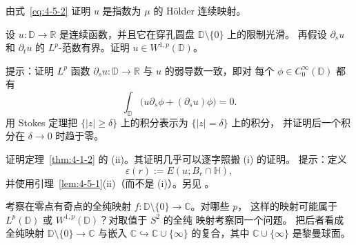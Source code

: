 \begin{exercise}\label{ex:4-5-3}
由式~\eqref{eq:4-5-2} 证明 $u$ 是指数为 $\mu$ 的 Hölder 连续映射。
\end{exercise}

\begin{exercise}\label{ex:4-5-4}
设 $u:\mathbb D\to\mathbb R$ 是连续函数，并且它在穿孔圆盘
$\mathbb D\setminus\{0\}$ 上的限制光滑。
再假设 $\partial_su$ 和 $\partial_tu$ 的 $L^p$-范数有界。证明
$u\in W^{1,p}(\mathbb D)$。

提示：证明 $L^p$ 函数 $\partial_su:\mathbb D\to\mathbb R$ 与 $u$ 的弱导数一致，即对
每个 $\phi\in C_0^\infty(\mathbb D)$ 都有
\[
  \int_{\mathbb D}\bigl(u\partial_s\phi+(\partial_su)\phi\bigr)=0.
\]
用 Stokes 定理把 $\{|z|\ge\delta\}$ 上的积分表示为 $\{|z|=\delta\}$ 上的积分，
并证明后一个积分在 $\delta\to0$ 时趋于零。
\end{exercise}

\begin{exercise}\label{ex:4-5-5}
证明定理~\ref{thm:4-1-2} 的 (ii)。其证明几乎可以逐字照搬 (i) 的证明。
提示：定义
\[
  \varepsilon(r):=E(u;B_r\cap\mathbb H),
\]
并使用引理~\ref{lem:4-5-1}(ii)（而不是 (i)）。另见 。
\end{exercise}

\begin{exercise}\label{ex:4-5-6}
考察在零点有奇点的全纯映射 $f:\mathbb D\setminus\{0\}\to\mathbb C$。对哪些 $p$，
这样的映射可能属于 $L^p(\mathbb D)$ 或 $W^{1,p}(\mathbb D)$？对取值于 $S^2$ 的全纯
映射考察同一个问题。
把后者看成全纯映射 $\mathbb D\setminus\{0\}\to\mathbb C$ 与嵌入
$\mathbb C\hookrightarrow\mathbb C\cup\{\infty\}$ 的复合，其中
$\mathbb C\cup\{\infty\}$ 是黎曼球面。
\end{exercise}
